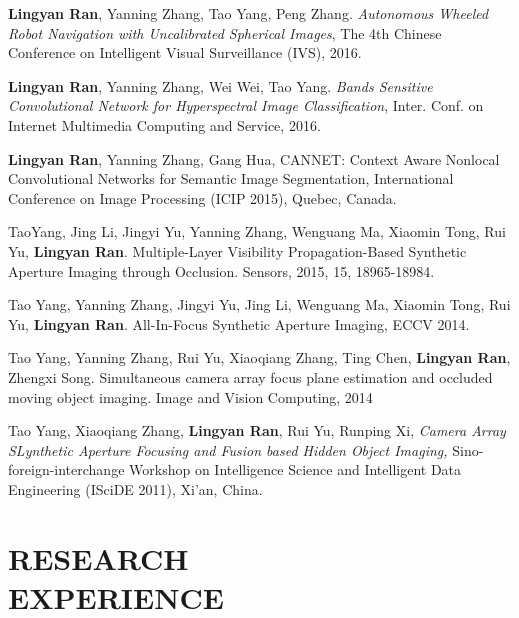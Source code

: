 \documentclass[margin]{res}
\begin{document}
\begin{resume}
  \textbf{Lingyan Ran}, Yanning Zhang, Tao Yang, Peng Zhang. \textit{Autonomous Wheeled Robot Navigation with Uncalibrated Spherical Images}, The 4th Chinese Conference on Intelligent Visual Surveillance (IVS), 2016.

  \textbf{Lingyan Ran}, Yanning Zhang, Wei Wei, Tao Yang. \textit{Bands Sensitive Convolutional Network for Hyperspectral Image Classification}, Inter. Conf. on Internet Multimedia Computing and Service, 2016.

                \textbf{Lingyan Ran}, Yanning Zhang, Gang Hua, CANNET: Context Aware Nonlocal Convolutional Networks for Semantic Image Segmentation, International Conference on Image Processing (ICIP 2015), Quebec, Canada.

                TaoYang, Jing Li, Jingyi Yu, Yanning Zhang, Wenguang Ma, Xiaomin Tong, Rui Yu, \textbf{Lingyan Ran}. Multiple-Layer Visibility Propagation-Based Synthetic Aperture Imaging through Occlusion. Sensors, 2015, 15, 18965-18984.

                Tao Yang, Yanning Zhang, Jingyi Yu, Jing Li, Wenguang Ma, Xiaomin Tong, Rui Yu, \textbf{Lingyan Ran}. All-In-Focus Synthetic Aperture Imaging, ECCV 2014.

                Tao Yang, Yanning Zhang, Rui Yu, Xiaoqiang Zhang, Ting Chen, \textbf{Lingyan Ran}, Zhengxi Song. Simultaneous
                camera array focus plane estimation and occluded moving object imaging. Image and Vision Computing, 2014

                Tao Yang, Xiaoqiang Zhang, \textbf{Lingyan Ran}, Rui Yu, Runping Xi, {\sl Camera Array SLynthetic Aperture Focusing and
                Fusion based Hidden Object Imaging,} Sino-foreign-interchange Workshop on Intelligence Science and Intelligent
                Data Engineering (ISciDE 2011), Xi’an, China.

\section{RESEARCH \\EXPERIENCE}


\end{resume}
\end{document}
